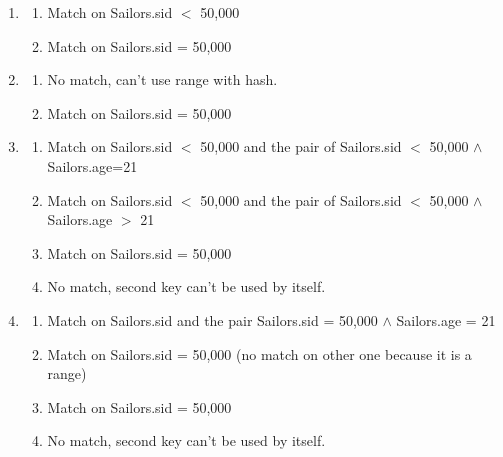 \begin{problem}{12.4}
  \begin{solution}
    \begin{enumerate}
      \item \begin{enumerate}[label=\Alph*]
        \item Match on Sailors.sid $<$ 50,000\\
        \item Match on Sailors.sid = 50,000
      \end{enumerate}
      \item \begin{enumerate}[label=\Alph*]
        \item No match, can't use range with hash.\\
        \item Match on Sailors.sid = 50,000
      \end{enumerate}
      \item \begin{enumerate}[label=\Alph*]
        \item Match on Sailors.sid $<$ 50,000 and the pair of Sailors.sid $<$ 50,000 $\land$ Sailors.age=21 \\
        \item Match on Sailors.sid $<$ 50,000 and the pair of Sailors.sid $<$ 50,000 $\land$ Sailors.age $>$ 21 \\
        \item Match on Sailors.sid = 50,000 \\
        \item No match, second key can't be used by itself.
      \end{enumerate}
      \item \begin{enumerate}[label=\Alph*]
        \item Match on Sailors.sid and the pair Sailors.sid = 50,000 $\land$ Sailors.age = 21 \\
        \item Match on Sailors.sid = 50,000 (no match on other one because it is a range) \\
        \item Match on Sailors.sid = 50,000 \\
        \item No match, second key can't be used by itself.
      \end{enumerate}
    \end{enumerate}
  \end{solution}
\end{problem}

